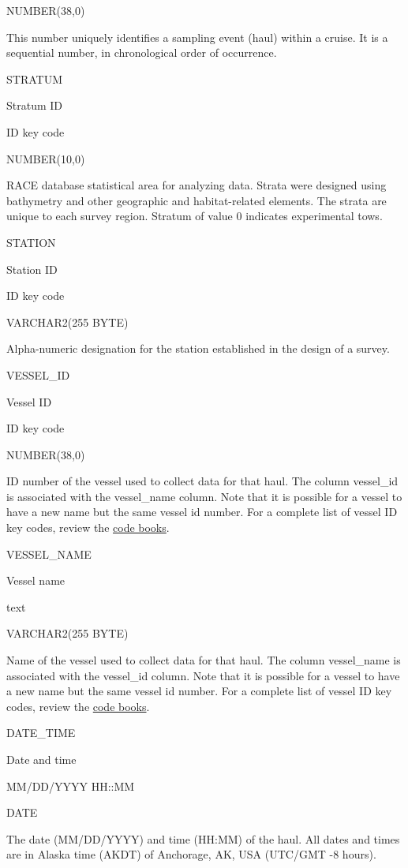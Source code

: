 \documentclass[
  letterpaper,
  oneside,
  open=any]{scrbook}
\begin{document}
NUMBER(38,0)

This number uniquely identifies a sampling event (haul) within a cruise.
It is a sequential number, in chronological order of occurrence.

STRATUM

Stratum ID

ID key code

NUMBER(10,0)

RACE database statistical area for analyzing data. Strata were designed
using bathymetry and other geographic and habitat-related elements. The
strata are unique to each survey region. Stratum of value 0 indicates
experimental tows.

STATION

Station ID

ID key code

VARCHAR2(255 BYTE)

Alpha-numeric designation for the station established in the design of a
survey.

VESSEL\_ID

Vessel ID

ID key code

NUMBER(38,0)

ID number of the vessel used to collect data for that haul. The column
vessel\_id is associated with the vessel\_name column. Note that it is
possible for a vessel to have a new name but the same vessel id number.
For a complete list of vessel ID key codes, review the
\href{https://www.fisheries.noaa.gov/resource/document/groundfish-survey-species-code-manual-and-data-codes-manual}{code
books}.

VESSEL\_NAME

Vessel name

text

VARCHAR2(255 BYTE)

Name of the vessel used to collect data for that haul. The column
vessel\_name is associated with the vessel\_id column. Note that it is
possible for a vessel to have a new name but the same vessel id number.
For a complete list of vessel ID key codes, review the
\href{https://www.fisheries.noaa.gov/resource/document/groundfish-survey-species-code-manual-and-data-codes-manual}{code
books}.

DATE\_TIME

Date and time

MM/DD/YYYY HH::MM

DATE

The date (MM/DD/YYYY) and time (HH:MM) of the haul. All dates and times
are in Alaska time (AKDT) of Anchorage, AK, USA (UTC/GMT -8 hours).
\end{document}
